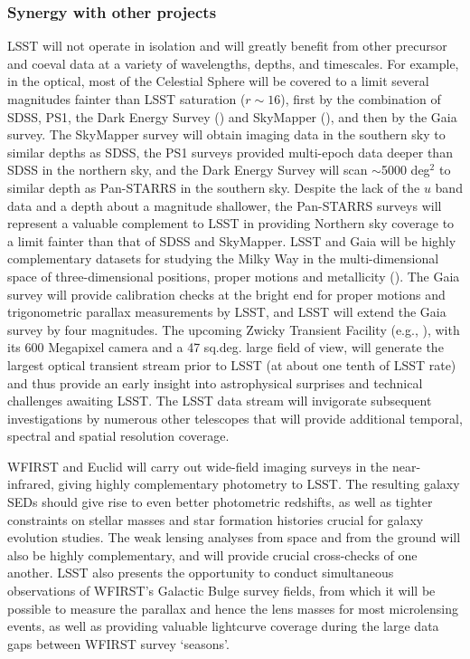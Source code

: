 \subsubsection{  Synergy with other projects }

LSST will not operate in isolation and will greatly benefit from other precursor and coeval
data at a variety of wavelengths, depths, and timescales. For example,
in the optical, most of the Celestial
Sphere will be covered to a limit several magnitudes fainter than LSST saturation
($r\sim16$), first by the combination of SDSS, PS1, the Dark Energy Survey (\cite{2006SPIE.6269E..2CF}) and SkyMapper (\cite{2007PASA...24....1K}),
and then by the Gaia survey. The SkyMapper survey will obtain imaging data in the southern
sky to similar depths as SDSS, the PS1 surveys provided multi-epoch data deeper
than SDSS in the northern sky, and the Dark Energy Survey will scan
$\sim$5000 deg$^2$ to similar depth as Pan-STARRS in the southern sky. Despite the lack of
the $u$ band data and a depth about a magnitude shallower, the Pan-STARRS surveys
will represent a valuable complement to LSST in providing Northern sky coverage to a limit
fainter than that of SDSS and SkyMapper. LSST and Gaia will
be highly complementary datasets for studying the Milky Way in the multi-dimensional space of
three-dimensional positions, proper motions and metallicity (\cite{2012ARA&A..50..251I}).
The Gaia survey will provide calibration checks at the bright end for proper
motions and trigonometric parallax measurements by LSST, and LSST will extend the
Gaia survey by four magnitudes. The upcoming Zwicky Transient Facility (e.g., \cite{2017arXiv170801584L}),
with its 600 Megapixel camera and a 47 sq.deg. large field of view, will generate the largest
optical transient stream prior to LSST (at about one tenth of LSST rate) and thus provide
an early insight into astrophysical surprises and technical challenges awaiting LSST.
The LSST data stream will invigorate subsequent investigations by numerous other telescopes
that will provide additional temporal, spectral and spatial resolution coverage.

WFIRST and Euclid will carry out wide-field imaging surveys in the
near-infrared, giving highly complementary photometry to LSST.  The
resulting galaxy SEDs should give rise to even better photometric
redshifts, as well as tighter constraints on stellar masses and star
formation histories crucial for galaxy evolution studies.  The weak
lensing analyses from space and from the ground will also be highly
complementary, and will provide crucial cross-checks of one another.
LSST also presents the opportunity to conduct simultaneous observations
of WFIRST's Galactic Bulge survey fields, from which it will be possible to
measure the parallax and hence the lens masses for most microlensing
events, as well as providing valuable lightcurve coverage during the large
data gaps between WFIRST survey `seasons'.

